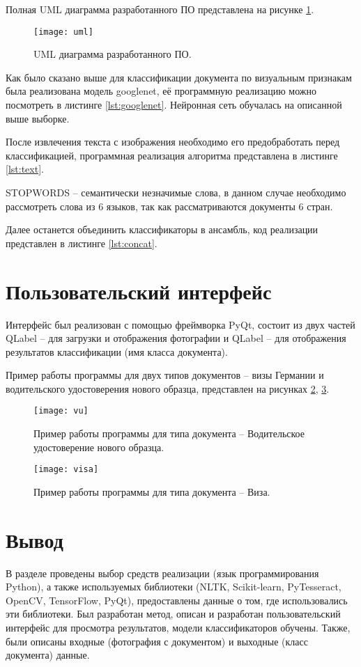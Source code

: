 Полная UML диаграмма разработанного ПО представлена на рисунке \ref{img:uml}.

\begin{figure}[H]
	\centering
	\texttt{[image: uml]}
	\caption{UML диаграмма разработанного ПО. }
	\label{img:uml}
\end{figure}

Как было сказано выше для классификации документа по визуальным признакам была реализована модель googlenet, её программную реализацию можно посмотреть в листинге \ref{lst:googlenet}. Нейронная сеть обучалась на описанной выше выборке.

После извлечения текста с изображения необходимо его предобработать перед классификацией, программная реализация алгоритма представлена в листинге \ref{lst:text}. 

STOPWORDS -- семантически незначимые слова, в данном случае необходимо рассмотреть слова из 6 языков, так как рассматриваются документы 6 стран.

Далее останется объединить классификаторы в ансамбль, код реализации представлен в листинге \ref{lst:concat}. 

\section{Пользовательский интерфейс }

Интерфейс был реализован с помощью фреймворка PyQt, состоит из двух частей QLabel -- для загрузки и отображения фотографии и QLabel -- для отображения результатов классификации (имя класса документа).

Пример работы программы для двух типов документов -- визы Германии и водительского удостоверения нового образца, представлен на рисунках \ref{img:vu}, \ref{img:visa}.

\begin{figure}[H]
	\centering
	\texttt{[image: vu]}
	\caption{Пример работы программы для типа документа -- Водительское удостоверение нового образца. }
	\label{img:vu}
\end{figure}

\begin{figure}[H]
	\centering
	\texttt{[image: visa]}
	\caption{Пример работы программы для типа документа -- Виза. }
	\label{img:visa}
\end{figure}

\section{Вывод}

В разделе проведены выбор средств реализации (язык программирования Python), а также используемых библиотеки (NLTK, Scikit-learn, PyTesseract, OpenCV, TensorFlow, PyQt), предоставлены данные о том, где использовались эти библиотеки. Был разработан метод, описан и разработан пользовательский интерфейс для просмотра результатов, модели классификаторов обучены. Также, были описаны входные (фотография с документом) и выходные (класс документа) данные.

